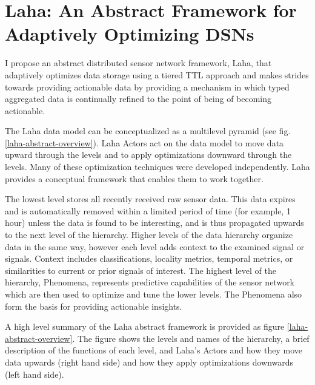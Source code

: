 \section{Laha: An Abstract Framework for Adaptively Optimizing DSNs}
I propose an abstract distributed sensor network framework, Laha, that adaptively optimizes data storage using a tiered TTL approach and makes strides towards providing actionable data by providing a mechanism in which typed aggregated data is continually refined to the point of being of becoming actionable. %

The Laha data model can be conceptualized as a multilevel pyramid (see fig. \ref{laha-abstract-overview}). Laha Actors act on the data model to move data upward through the levels and to apply optimizations downward through the levels. Many of these optimization techniques were developed independently. Laha provides a conceptual framework that enables them to work together.

The lowest level stores all recently received raw sensor data. This data expires and is automatically removed within a limited period of time (for example, 1 hour) unless the data is found to be interesting, and is thus propagated upwards to the next level of the hierarchy.  Higher levels of the data hierarchy organize data in the same way, however each level adds context to the examined signal or signals. Context includes classifications, locality metrics, temporal metrics, or similarities to current or prior signals of interest. The highest level of the hierarchy, Phenomena, represents predictive capabilities of the sensor network which are then used to optimize and tune the lower levels. The Phenomena also form the basis for providing actionable insights. 

A high level summary of the Laha abstract framework is provided as figure \ref{laha-abstract-overview}. The figure shows the levels and names of the hierarchy, a brief description of the functions of each level, and Laha's Actors and how they move data upwards (right hand side) and how they apply optimizations downwards (left hand side).

